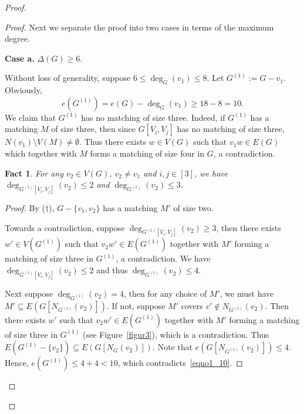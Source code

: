 \documentclass[11pt, reqno]{amsart}    	%
\newtheorem{fact}{Fact}
\theoremstyle{definition}
\newcommand{\red}[1]{\textcolor[rgb]{0.93,0.08,0.17}{#1}}    %
\numberwithin{equation}{section}
\begin{document}
\begin{proof}
\begin{proof}
			Next  we separate the proof into two cases in terms of the maximum degree.
			
			\textbf{Case a.} $\Delta(G) \ge 6 .$
			
			Without loss of generality, suppose $ 6\le \deg_{G}(v_1) \le 8$. Let $G^{(1)} :=G-v_1$. Obviously, 
			\[ \label{eqno1_10} e(G^{(1)})= e(G)-\deg_{G}(v_1)\ge 18-8=10.  \tag{6.11} \]
			We claim that $G^{(1)}$ has no matching of size three. 
			Indeed, if $G^{(1)}$ has a matching $M$ of size three, then since $G[V_i,V_j]$ has no matching of size three, $N(v_1)\setminus V(M)\neq \emptyset$.
			Thus there exists $w\in V(G)$ such that $v_1w\in E(G)$ which together with $M$ forms a matching of size four in $G$, a contradiction. 
			
			
			\begin{fact}\label{f7}
				For any $v_2\in V(G)$, $ v_2 \ne v_1 $ and $i,j \in [3]$, we have $\deg_{G^{(1)}[V_i,V_j]}(v_2) \le 2$ and $\deg_{G^{(1)}}(v_2) \le 3$.
			\end{fact}			
			\begin{proof}By ($\dagger$),  $G-\{v_1,v_2\}$ has a matching $M'$ of size two.	
				
				Towards a contradiction, suppose $\deg_{G^{(1)}[V_i,V_j]}(v_2) \ge 3$, then there exists $w'\in V(G^{(1)})$ such that $v_2w'\in E(G^{(1)})$ together with $M'$  forming a matching of size three in $G^{(1)}$, a contradiction. We have $\deg_{G^{(1)}[V_i,V_j]}(v_2) \le 2$ and thus $\deg_{G^{(1)}}(v_2) \le 4$.
				
				Next suppose $\deg_{G^{(1)}}(v_2) = 4$, then for any choice of $M'$, we must have $ M'\subseteq E(G[N_{G^{(1)}}(v_2)])$. If not, suppose   $M'$ covers $v'\notin N_{G^{(1)}}(v_2)$. Then  there exists $w'$ such that $v_2w'\in E(G^{(1)})$ together with $M'$  forming a matching of size three in $G^{(1)}$ (see Figure~\ref{figur3}), which is a contradiction.  Thus $ E(G^{(1)}-\{v_2\})\subseteq E(G[N_{G}(v_2)])$. Note that $e(G[N_{G^{(1)}}(v_2)])\le4$. Hence, $ e(G^{(1)})\le 4+4<10 $,  which contradicts~\eqref{eqno1_10}. \end{proof}
			
			\begin{figure}[h]
				\begin{center}
					\begin{tikzpicture}
						[inner sep=2pt,
						vertex/.style={circle, draw=black!50, fill=black!50},
						rect/.style={rectangle, inner sep=7,minimum size=0.8},
						]
						

\end{tikzpicture}
\end{center}
\end{figure}
\end{proof}
\end{proof}
\end{document}
